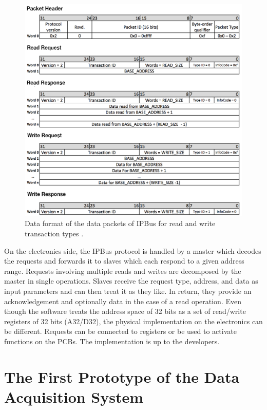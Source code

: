       \begin{figure}[h!]
        \centering
        \includegraphics[width=\textwidth]{img/II-2-daq/ipbus.png}
        \caption{Data format of the data packets of IPBus for read and write transaction types \cite{AMC13}.}
        \label{fig:II-2-ipbus}
      \end{figure}

      On the electronics side, the IPBus protocol is handled by a master which decodes the requests and forwards it to slaves which each respond to a given address range. Requests involving multiple reads and writes are decomposed by the master in single operations. Slaves receive the request type, address, and data as input parameters and can then treat it as they like. In return, they provide an acknowledgement and optionally data in the case of a read operation. Even though the software treats the address space of 32 bits as a set of read/write registers of 32 bits (A32/D32), the physical implementation on the electronics can be different. Requests can be connected to registers or be used to activate functions on the PCBs. The implementation is up to the developers.

  \section{The First Prototype of the Data Acquisition System}

